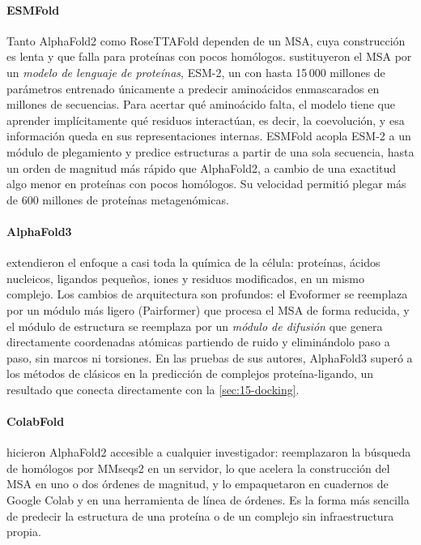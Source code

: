 \paragraph{ESMFold} Tanto AlphaFold2 como RoseTTAFold dependen de un MSA, cuya construcción es lenta y que falla para proteínas con pocos homólogos. \textcite{c15-lin2023} sustituyeron el MSA por un \emph{modelo de lenguaje de proteínas}, ESM-2, un  con hasta 15\,000 millones de parámetros entrenado únicamente a predecir aminoácidos enmascarados en millones de secuencias. Para acertar qué aminoácido falta, el modelo tiene que aprender implícitamente qué residuos interactúan, es decir, la coevolución, y esa información queda en sus representaciones internas. ESMFold acopla ESM-2 a un módulo de plegamiento y predice estructuras a partir de una sola secuencia, hasta un orden de magnitud más rápido que AlphaFold2, a cambio de una exactitud algo menor en proteínas con pocos homólogos. Su velocidad permitió plegar más de 600 millones de proteínas metagenómicas.

\paragraph{AlphaFold3} \textcite{c15-abramson2024} extendieron el enfoque a casi toda la química de la célula: proteínas, ácidos nucleicos, ligandos pequeños, iones y residuos modificados, en un mismo complejo. Los cambios de arquitectura son profundos: el Evoformer se reemplaza por un módulo más ligero (Pairformer) que procesa el MSA de forma reducida, y el módulo de estructura se reemplaza por un \emph{módulo de difusión} que genera directamente coordenadas atómicas partiendo de ruido y eliminándolo paso a paso, sin marcos ni torsiones. En las pruebas de sus autores, AlphaFold3 superó a los métodos de  clásicos en la predicción de complejos proteína-ligando, un resultado que conecta directamente con la \cref{sec:15-docking}.

\paragraph{ColabFold} \textcite{c15-mirdita2022} hicieron AlphaFold2 accesible a cualquier investigador: reemplazaron la búsqueda de homólogos por MMseqs2 en un servidor, lo que acelera la construcción del MSA en uno o dos órdenes de magnitud, y lo empaquetaron en cuadernos de Google Colab y en una herramienta de línea de órdenes. Es la forma más sencilla de predecir la estructura de una proteína o de un complejo sin infraestructura propia.

